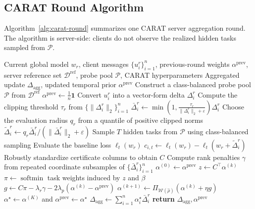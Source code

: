 \documentclass{article}
\newcommand{\softmin}{\operatorname*{softmin}}
\begin{document}
\subsection{CARAT Round Algorithm}
\label{sec:appendix-algorithm}

Algorithm~\ref{alg:carat-round} summarizes one CARAT server aggregation round. The algorithm is server-side: clients do not observe the realized hidden tasks sampled from $\mathcal{P}$.

\begin{algorithm}[t]
\caption{CARAT server aggregation at round $r$}
\label{alg:carat-round}
\begin{algorithmic}[1]
\REQUIRE Current global model $w_r$, client messages $\{u_i^r\}_{i=1}^n$, previous-round weights $\alpha^{\mathrm{prev}}$, server reference set $\mathcal{D}^{\mathrm{ref}}$, probe pool $\mathcal{P}$, CARAT hyperparameters
\ENSURE Aggregated update $\Delta_{\mathrm{agg}}$, updated temporal prior $\alpha^{\mathrm{prev}}$
    \STATE Construct a class-balanced probe pool $\mathcal{P}$ from $\mathcal{D}^{\mathrm{ref}}$
\ENDIF
{}
    \STATE $\alpha^{\mathrm{prev}} \leftarrow \frac{1}{n}\mathbf{1}$
\ENDIF
{}
    \STATE Convert $u_i^r$ into a vector-form delta $\Delta_i^r$
\ENDFOR
\STATE Compute the clipping threshold $\tau_r$ from $\{\|\Delta_i^r\|_2\}_{i=1}^n$
    \STATE $\bar{\Delta}_i^r \leftarrow \min\!\left(1,\frac{\tau_r}{\|\Delta_i^r\|_2+\varepsilon}\right)\Delta_i^r$
\ENDFOR
\STATE Choose the evaluation radius $q_r$ from a quantile of positive clipped norms
    \STATE $\tilde{\Delta}_i^r \leftarrow q_r \bar{\Delta}_i^r / (\|\bar{\Delta}_i^r\|_2+\varepsilon)$
\ENDFOR
\STATE Sample $T$ hidden tasks from $\mathcal{P}$ using class-balanced sampling
    \STATE Evaluate the baseline loss $\ell_t(w_r)$
\ENDFOR
{}
        \STATE $c_{i,t} \leftarrow \ell_t(w_r) - \ell_t(w_r + \tilde{\Delta}_i^r)$
    \ENDFOR
\ENDFOR
\STATE Robustly standardize certificate columns to obtain $C$
\STATE Compute rank penalties $\gamma$ from repeated coordinate subsamples of $\{\bar{\Delta}_i^r\}_{i=1}^n$
\STATE $\alpha^{(0)} \leftarrow \alpha^{\mathrm{prev}}$
    \STATE $z \leftarrow C^\top \alpha^{(k)}$
    \STATE $\pi \leftarrow \softmin$ task weights induced by $z$ and $\beta$
    \STATE $g \leftarrow C\pi - \lambda_r \gamma - 2\lambda_p(\alpha^{(k)}-\alpha^{\mathrm{prev}})$
    \STATE $\alpha^{(k+1)} \leftarrow \Pi_{\mathcal{W}(\hat{\rho})}\!\left(\alpha^{(k)}+\eta g\right)$
\ENDFOR
\STATE $\alpha^\star \leftarrow \alpha^{(K)}$ and $\alpha^{\mathrm{prev}} \leftarrow \alpha^\star$
\STATE $\Delta_{\mathrm{agg}} \leftarrow \sum_{i=1}^n \alpha_i^\star \bar{\Delta}_i^r$
\STATE \textbf{return} $\Delta_{\mathrm{agg}}, \alpha^{\mathrm{prev}}$
\end{algorithmic}
\end{algorithm}
\end{document}
